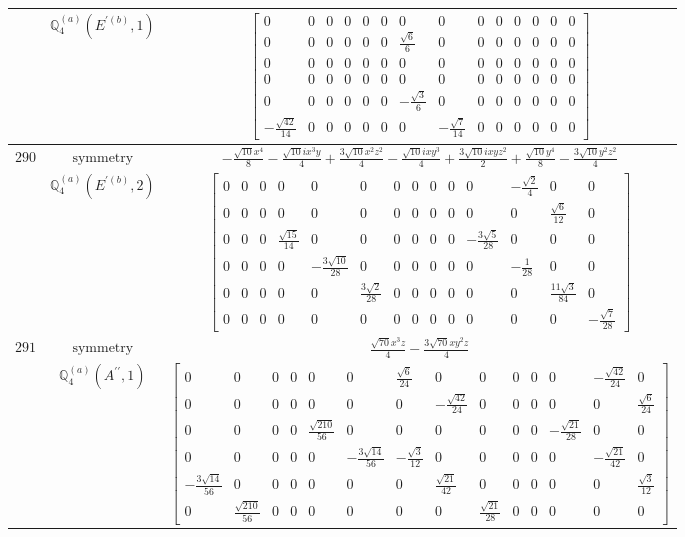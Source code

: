 \documentclass[fleqn,8pt,landscape]{jsarticle}
\begin{document}
\begin{longtable}{ccc}
$  $ & $ \mathbb{Q}_{4}^{(a)}(E^{\prime(b)},1) $ & $ \begin{bmatrix} 0 & 0 & 0 & 0 & 0 & 0 & 0 & 0 & 0 & 0 & 0 & 0 & 0 & 0 \\ 0 & 0 & 0 & 0 & 0 & 0 & \frac{\sqrt{6}}{6} & 0 & 0 & 0 & 0 & 0 & 0 & 0 \\ 0 & 0 & 0 & 0 & 0 & 0 & 0 & 0 & 0 & 0 & 0 & 0 & 0 & 0 \\ 0 & 0 & 0 & 0 & 0 & 0 & 0 & 0 & 0 & 0 & 0 & 0 & 0 & 0 \\ 0 & 0 & 0 & 0 & 0 & 0 & - \frac{\sqrt{3}}{6} & 0 & 0 & 0 & 0 & 0 & 0 & 0 \\ - \frac{\sqrt{42}}{14} & 0 & 0 & 0 & 0 & 0 & 0 & - \frac{\sqrt{7}}{14} & 0 & 0 & 0 & 0 & 0 & 0 \end{bmatrix} $ \\ \hline
$ 290 $ & $ \text{symmetry} $ & $ - \frac{\sqrt{10} x^{4}}{8} - \frac{\sqrt{10} i x^{3} y}{4} + \frac{3 \sqrt{10} x^{2} z^{2}}{4} - \frac{\sqrt{10} i x y^{3}}{4} + \frac{3 \sqrt{10} i x y z^{2}}{2} + \frac{\sqrt{10} y^{4}}{8} - \frac{3 \sqrt{10} y^{2} z^{2}}{4} $ \\
$  $ & $ \mathbb{Q}_{4}^{(a)}(E^{\prime(b)},2) $ & $ \begin{bmatrix} 0 & 0 & 0 & 0 & 0 & 0 & 0 & 0 & 0 & 0 & 0 & - \frac{\sqrt{2}}{4} & 0 & 0 \\ 0 & 0 & 0 & 0 & 0 & 0 & 0 & 0 & 0 & 0 & 0 & 0 & \frac{\sqrt{6}}{12} & 0 \\ 0 & 0 & 0 & \frac{\sqrt{15}}{14} & 0 & 0 & 0 & 0 & 0 & 0 & - \frac{3 \sqrt{5}}{28} & 0 & 0 & 0 \\ 0 & 0 & 0 & 0 & - \frac{3 \sqrt{10}}{28} & 0 & 0 & 0 & 0 & 0 & 0 & - \frac{1}{28} & 0 & 0 \\ 0 & 0 & 0 & 0 & 0 & \frac{3 \sqrt{2}}{28} & 0 & 0 & 0 & 0 & 0 & 0 & \frac{11 \sqrt{3}}{84} & 0 \\ 0 & 0 & 0 & 0 & 0 & 0 & 0 & 0 & 0 & 0 & 0 & 0 & 0 & - \frac{\sqrt{7}}{28} \end{bmatrix} $ \\ \hline
$ 291 $ & $ \text{symmetry} $ & $ \frac{\sqrt{70} x^{3} z}{4} - \frac{3 \sqrt{70} x y^{2} z}{4} $ \\
$  $ & $ \mathbb{Q}_{4}^{(a)}(A^{\prime\prime},1) $ & $ \begin{bmatrix} 0 & 0 & 0 & 0 & 0 & 0 & \frac{\sqrt{6}}{24} & 0 & 0 & 0 & 0 & 0 & - \frac{\sqrt{42}}{24} & 0 \\ 0 & 0 & 0 & 0 & 0 & 0 & 0 & - \frac{\sqrt{42}}{24} & 0 & 0 & 0 & 0 & 0 & \frac{\sqrt{6}}{24} \\ 0 & 0 & 0 & 0 & \frac{\sqrt{210}}{56} & 0 & 0 & 0 & 0 & 0 & 0 & - \frac{\sqrt{21}}{28} & 0 & 0 \\ 0 & 0 & 0 & 0 & 0 & - \frac{3 \sqrt{14}}{56} & - \frac{\sqrt{3}}{12} & 0 & 0 & 0 & 0 & 0 & - \frac{\sqrt{21}}{42} & 0 \\ - \frac{3 \sqrt{14}}{56} & 0 & 0 & 0 & 0 & 0 & 0 & \frac{\sqrt{21}}{42} & 0 & 0 & 0 & 0 & 0 & \frac{\sqrt{3}}{12} \\ 0 & \frac{\sqrt{210}}{56} & 0 & 0 & 0 & 0 & 0 & 0 & \frac{\sqrt{21}}{28} & 0 & 0 & 0 & 0 & 0 \end{bmatrix} $ \\ \hline

\end{longtable}
\end{document}
